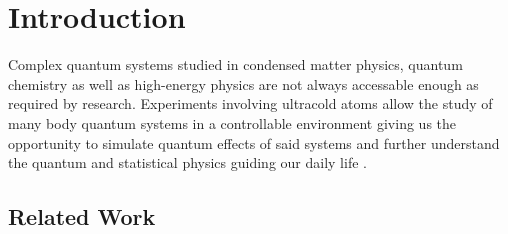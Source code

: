 \chapter{Introduction}

Complex quantum systems studied in condensed matter physics, quantum chemistry
as well as high-energy physics are not always accessable enough as required
by research. Experiments involving ultracold atoms allow the study of many
body quantum systems in a controllable environment giving us the opportunity
to simulate quantum effects of said systems and further understand the quantum
and statistical physics guiding our daily life \cite{Gross2017}.



\section{Related Work}

% 


